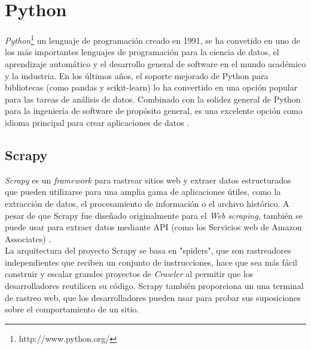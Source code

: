 
\section{Python}
\textit{Python}\footnote{http://www.python.org/} un lenguaje de programación creado en 1991, se ha convetido en uno de los más 
importantes lenguajes de programación para la ciencia de datos, el aprendizaje automático y el desarrollo general de software en 
el mundo académico y la industria. 
En los últimos años, el soporte mejorado de Python para bibliotecas (como pandas y scikit-learn) lo ha convertido en una opción popular 
para las tareas de análisis de datos. Combinado con la solidez general de Python para la ingeniería de software de propósito general, 
es una excelente opción como idioma principal para crear aplicaciones de datos \citep{CTPython}.


\subsection{Scrapy}
\textit{Scrapy} es un \textit{framework} para rastrear sitios web y extraer datos estructurados que pueden utilizarse para una amplia 
gama de aplicaciones útiles, como la extracción de datos, el procesamiento de información o el archivo histórico.
A pesar de que Scrapy fue diseñado originalmente para el \textit{Web scraping}, también se puede usar para extraer datos mediante 
API (como los Servicios web de Amazon Associates) \citep{CTScrapy}.\\

La arquitectura del proyecto Scrapy se basa en "spiders", que son rastreadores independientes que reciben un conjunto de instrucciones,
hace que sea más fácil construir y escalar grandes proyectos de \textit{Crawler} al permitir que los desarrolladores reutilicen su 
código. Scrapy también proporciona un una terminal de rastreo web, que los desarrolladores pueden usar para probar sus suposiciones 
sobre el comportamiento de un sitio.
